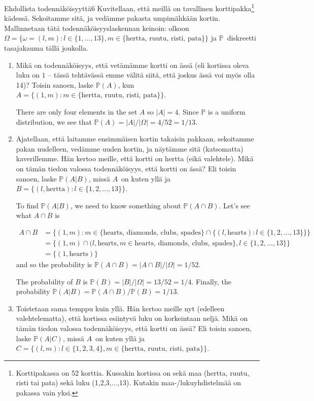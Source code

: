 \documentclass[11pt,a4paper]{amsart}
\newcommand{\1}{\mathbf{1}}
\renewcommand{\P}{\mathbb P}
\begin{document}
\begin{Exercises}{Ehdollista todennäköisyyttä}{6}
Kuvitellaan, että meillä on tavallinen korttipakka\footnote{Korttipakassa on 52 korttia. Kussakin kortissa on sekä maa (hertta, ruutu, risti tai pata) sekä luku (1,2,3,...,13). Kutakin maa-/lukuyhdistelmää on pakassa vain yksi.} kädessä. Sekoitamme sitä, ja vedämme pakasta umpimähkään kortin. Mallinnetaan tätä todennäköisyyslaskennan keinoin: olkoon $\Omega=\{\omega=(l,m): l\in \{1,...,13\} , m\in \{\text{hertta, ruutu, risti, pata}\}\}$ ja $\P$ diskreetti tasajakauma tällä joukolla. 

\begin{enumerate}
\item Mikä on todennäköisyys, että vetämämme kortti on ässä (eli kortissa oleva luku on $1$ -- tässä tehtävässä emme välitä siitä, että joskus ässä voi myös olla 14)? Toisin sanoen, laske $\P(A)$, kun $A=\{(1,m): m\in \{\text{hertta, ruutu, risti, pata}\}\}$.

    There are only four elements in the set $ A$ so $ |A| = 4$. Since $ \P$ is a uniform
    distribution, we see that $ \P(A) = |A|/|\Omega| = 4/52 = 1/13$.
\item Ajatellaan, että laitamme ensimmäisen kortin takaisin pakkaan, sekoitamme pakan uudelleen, vedämme uuden kortin, ja näytämme sitä (katsomatta) kaverillemme. Hän kertoo meille, että kortti on hertta (eikä valehtele). Mikä on tämän tiedon valossa todennäköisyys, että kortti on ässä? Eli toisin sanoen, laske $\P(A|B)$, missä $A$ on kuten yllä ja $B=\{(l,\text{hertta}): l\in \{1,2,...,13\}\}$. 

    To find $ \P(A | B)$, we need to know something about $ \P(A \cap B)$. Let's see what $ A \cap
    B$ is

    \begin{align*}
	A \cap B &= \{ (1,m): m \in \{ \mbox{hearts, diamonds, clubs, spades}  \} \cap \{ (l,
	\mbox{hearts} ): l \in \{ 1,2,\dots,13 \}  \}  \} \\
		 &= \{ (1,m) \cap (l, \mbox{hearts}, m \in  \mbox{hearts, diamonds, clubs, spades}
	     \}  , l \in \{ 1,2,\dots,13 \} \} \\
		 &= \{ (1, \mbox{hearts} )  \}  
    \end{align*}
    and so the probability is $ \P(A \cap B) = |A \cap B| /|\Omega| = 1/52$.  

    The probability of $ B$ is $ \P(B) = |B|/|\Omega| = 13/52 = 1/4$. Finally, the probability $
    \P(A |B) = \P(A\cap B)/\P(B) = 1/13$.
\item Toistetaan sama temppu kuin yllä. Hän kertoo meille nyt (edelleen valehtelematta), että kortissa esiintyvä luku on korkeintaan neljä. Mikä on tämän tiedon valossa todennäköisyys, että kortti on ässä? Eli toisin sanoen, laske $\P(A|C)$, missä $A$ on kuten yllä ja $C=\{(l,m): l\in \{1,2,3,4\}, m\in \{\text{hertta, ruutu, risti, pata}\}\}$.  


\end{enumerate}
\end{Exercises}
\end{document}
